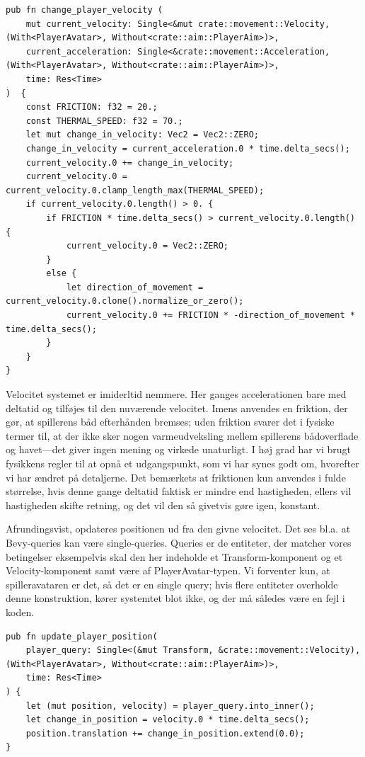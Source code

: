 \begin{verbatim}
pub fn change_player_velocity (
    mut current_velocity: Single<&mut crate::movement::Velocity, (With<PlayerAvatar>, Without<crate::aim::PlayerAim>)>,
    current_acceleration: Single<&crate::movement::Acceleration, (With<PlayerAvatar>, Without<crate::aim::PlayerAim>)>,
    time: Res<Time>
)  {
    const FRICTION: f32 = 20.;
    const THERMAL_SPEED: f32 = 70.;
    let mut change_in_velocity: Vec2 = Vec2::ZERO;
    change_in_velocity = current_acceleration.0 * time.delta_secs();
    current_velocity.0 += change_in_velocity;
    current_velocity.0 = current_velocity.0.clamp_length_max(THERMAL_SPEED);
    if current_velocity.0.length() > 0. {
        if FRICTION * time.delta_secs() > current_velocity.0.length() {
            current_velocity.0 = Vec2::ZERO;
        }
        else {
            let direction_of_movement = current_velocity.0.clone().normalize_or_zero();
            current_velocity.0 += FRICTION * -direction_of_movement * time.delta_secs(); 
        }
    }
}
\end{verbatim}

Velocitet systemet er imiderltid nemmere. Her ganges accelerationen bare med deltatid og tilføjes til den nuværende velocitet. Imens anvendes en friktion, der gør, at spillerens båd efterhånden bremses; uden friktion svarer det i fysiske termer til, at der ikke sker nogen varmeudveksling mellem spillerens bådoverflade og havet---det giver ingen mening og virkede unaturligt. I høj grad har vi brugt fysikkens regler til at opnå et udgangspunkt, som vi har synes godt om, hvorefter vi har ændret på detaljerne. Det bemærkets at friktionen kun anvendes i fulde størrelse, hvis denne gange deltatid faktisk er mindre end hastigheden, ellers vil hastigheden skifte retning, og det vil den så givetvis gøre igen, konstant.

Afrundingsvist, opdateres positionen ud fra den givne velocitet. Det ses bl.a. at Bevy-queries kan være single-queries. Queries er de entiteter, der matcher vores betingelser eksempelvis skal den her indeholde et Transform-komponent og et Velocity-komponent samt være af PlayerAvatar-typen. Vi forventer kun, at spilleravataren er det, så det er en single query; hvis flere entiteter overholde denne konstruktion, kører systemtet blot ikke, og der må således være en fejl i koden.
\begin{verbatim}
pub fn update_player_position(
    player_query: Single<(&mut Transform, &crate::movement::Velocity), (With<PlayerAvatar>, Without<crate::aim::PlayerAim>)>,
    time: Res<Time>
) {
    let (mut position, velocity) = player_query.into_inner();
    let change_in_position = velocity.0 * time.delta_secs();
    position.translation += change_in_position.extend(0.0);
}
\end{verbatim}
